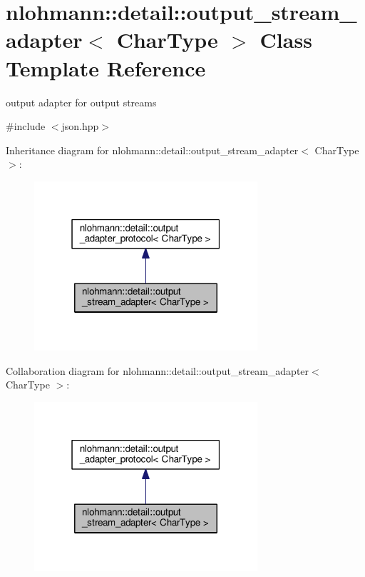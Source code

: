 \hypertarget{classnlohmann_1_1detail_1_1output__stream__adapter}{}\section{nlohmann\+:\+:detail\+:\+:output\+\_\+stream\+\_\+adapter$<$ Char\+Type $>$ Class Template Reference}
\label{classnlohmann_1_1detail_1_1output__stream__adapter}


output adapter for output streams  




{\ttfamily \#include $<$json.\+hpp$>$}



Inheritance diagram for nlohmann\+:\+:detail\+:\+:output\+\_\+stream\+\_\+adapter$<$ Char\+Type $>$\+:\nopagebreak
\begin{figure}[H]
\begin{center}
\leavevmode
\includegraphics[width=235pt]{classnlohmann_1_1detail_1_1output__stream__adapter__inherit__graph}
\end{center}
\end{figure}


Collaboration diagram for nlohmann\+:\+:detail\+:\+:output\+\_\+stream\+\_\+adapter$<$ Char\+Type $>$\+:\nopagebreak
\begin{figure}[H]
\begin{center}
\leavevmode
\includegraphics[width=235pt]{classnlohmann_1_1detail_1_1output__stream__adapter__coll__graph}
\end{center}
\end{figure}
